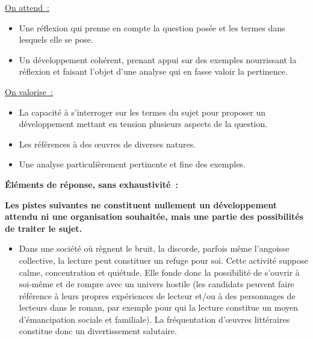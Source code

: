 {\underline{On attend~:}
\begin{itemize}
\item Une réflexion qui prenne en compte la question posée et les termes dans lesquels elle se pose.
\item Un développement cohérent, prenant appui sur des exemples nourrissant la réflexion et faisant
l'objet d'une analyse qui en fasse valoir la pertinence.
\end{itemize}

\underline{On valorise~:}
\begin{itemize}
\item La capacité à s'interroger sur les termes du sujet pour proposer un développement mettant en
tension plusieurs aspects de la question.
\item Les références à des œuvres de diverses natures.
\item Une analyse particulièrement pertinente et fine des exemples.
\end{itemize}

\bigskip

\textbf{Éléments de réponse, sans exhaustivité~:}

\textbf{Les pistes suivantes ne constituent nullement un développement attendu ni une
organisation souhaitée, mais une partie des possibilités de traiter le sujet.}

\begin{itemize}
\item Dans une société où règnent le bruit, la discorde, parfois même l'angoisse collective, la lecture
peut constituer un refuge pour soi. Cette activité suppose calme, concentration et quiétude. Elle
fonde donc la possibilité de s'ouvrir à soi-même et de rompre avec un univers hostile (les
candidats peuvent faire référence à leurs propres expériences de lecteur et/ou à des personnages
de lecteurs dans le roman,  par exemple pour qui la lecture constitue un moyen
d'émancipation sociale et familiale). La fréquentation d'œuvres littéraires constitue donc un
divertissement salutaire.


\end{itemize}}
